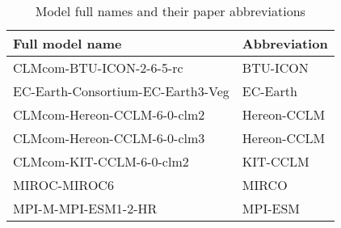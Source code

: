 \begin{table}[htbp]
  \centering
  \caption{Model full names and their paper abbreviations}
  \label{tab:model_abbrevs}
  \begin{tabular}{p{8cm}l}
    \toprule
    Full model name & Abbreviation \\
    \midrule
    CLMcom-BTU-ICON-2-6-5-rc & BTU-ICON \\
    EC-Earth-Consortium-EC-Earth3-Veg & EC-Earth \\
    CLMcom-Hereon-CCLM-6-0-clm2 & Hereon-CCLM \\
    CLMcom-Hereon-CCLM-6-0-clm3 & Hereon-CCLM \\
    CLMcom-KIT-CCLM-6-0-clm2 & KIT-CCLM \\
    MIROC-MIROC6 & MIRCO \\
    MPI-M-MPI-ESM1-2-HR & MPI-ESM \\
    \bottomrule
  \end{tabular}
\end{table}
